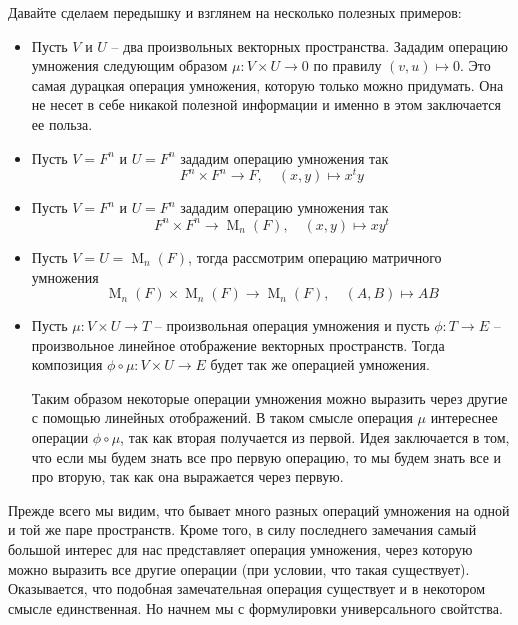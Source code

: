 Давайте сделаем передышку и взглянем на несколько полезных примеров:
\begin{itemize}
\item Пусть $V$ и $U$ -- два произвольных векторных пространства.
Зададим операцию умножения следующим образом $\mu\colon V\times U \to 0$ по правилу $(v, u) \mapsto 0$.
Это самая дурацкая операция умножения, которую только можно придумать.
Она не несет в себе никакой полезной информации и именно в этом заключается ее польза.

\item Пусть $V = F^n$ и $U = F^n$ зададим операцию умножения так
\[
F^n \times F^n \to F,\quad (x, y) \mapsto x^t y
\]

\item Пусть $V = F^n$ и $U = F^n$ зададим операцию умножения так
\[
F^n \times F^n \to \operatorname{M}_{n}(F),\quad (x, y)\mapsto xy^t
\]

\item Пусть $V = U= \operatorname{M}_n(F)$, тогда рассмотрим операцию матричного умножения
\[
\operatorname{M}_n(F)\times \operatorname{M}_n(F)\to \operatorname{M}_n(F),\quad (A, B)\mapsto AB
\]

\item Пусть $\mu \colon V\times U\to T$ -- произвольная операция умножения и пусть $\phi \colon T\to E$ -- произвольное линейное отображение векторных пространств.
Тогда композиция $\phi\circ \mu \colon V\times U \to E$ будет так же операцией умножения.


Таким образом некоторые операции умножения можно выразить через другие с помощью линейных отображений.
В таком смысле операция $\mu$ интереснее операции $\phi \circ \mu$, так как вторая получается из первой.
Идея заключается в том, что если мы будем знать все про первую операцию, то мы будем знать все и про вторую, так как она выражается через первую.
\end{itemize}

Прежде всего мы видим, что бывает много разных операций умножения на одной и той же паре пространств.
Кроме того, в силу последнего замечания самый большой интерес для нас представляет операция умножения, через которую можно выразить все другие операции (при условии, что такая существует).
Оказывается, что подобная замечательная операция существует и в некотором смысле единственная.
Но начнем мы с формулировки универсального свойтства.

